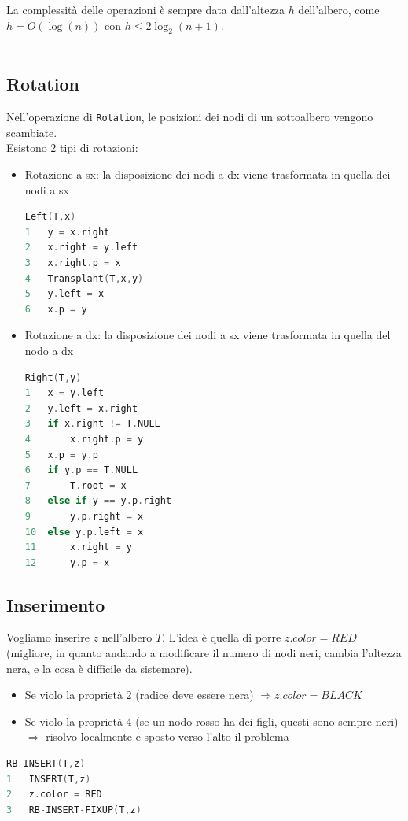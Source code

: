 La complessità delle operazioni è sempre data dall'altezza $h$ dell'albero, come $h = O(\log(n))$ con $h \leq 2 \log_2 (n+1)$. \\~\\

\subsection{Rotation}
Nell'operazione di \verb|Rotation|, le posizioni dei nodi di un sottoalbero vengono scambiate. \\
Esistono 2 tipi di rotazioni:
\begin{itemize}
    \item Rotazione a sx: la disposizione dei nodi a dx viene trasformata in quella dei nodi a sx
\begin{mdframed}
\begin{lstlisting}[language=C]
Left(T,x)
1   y = x.right
2   x.right = y.left
3   x.right.p = x
4   Transplant(T,x,y)
5   y.left = x
6   x.p = y
\end{lstlisting}
\end{mdframed}
    \item Rotazione a dx: la disposizione dei nodi a sx viene trasformata in quella del nodo a dx
\begin{mdframed}
\begin{lstlisting}[language=C]
Right(T,y)
1   x = y.left
2   y.left = x.right
3   if x.right != T.NULL
4       x.right.p = y
5   x.p = y.p
6   if y.p == T.NULL
7       T.root = x
8   else if y == y.p.right
9       y.p.right = x
10  else y.p.left = x
11      x.right = y
12      y.p = x
\end{lstlisting}
\end{mdframed}
\end{itemize}

\subsection{Inserimento}
Vogliamo inserire $z$ nell'albero $T$. L'idea è quella di porre $z$.$color = RED$(migliore, in quanto andando a modificare il numero di nodi neri, cambia l'altezza nera, e la cosa è difficile da sistemare).
\begin{itemize}
    \item Se violo la proprietà 2 (radice deve essere nera) $\Rightarrow z.color = BLACK$
    \item Se violo la proprietà 4 (se un nodo rosso ha dei figli, questi sono sempre neri) $\Rightarrow$ risolvo localmente e sposto verso l'alto il problema
\end{itemize}
\begin{mdframed}
\begin{lstlisting}[language=C]
RB-INSERT(T,z)
1   INSERT(T,z)
2   z.color = RED
3   RB-INSERT-FIXUP(T,z)
\end{lstlisting}
\end{mdframed}

